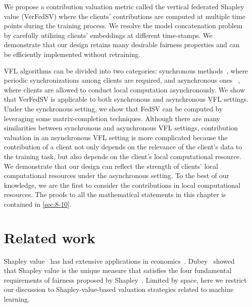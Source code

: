 We propose a contribution valuation metric called the vertical federated Shapley value (VerFedSV)
where the clients' contributions are computed at multiple time points during the training process. We resolve the model concatenation problem by carefully utilizing clients' embeddings at different time-stamps. 
We demonstrate that our design retains many desirable fairness properties and can be efficiently implemented without retraining. 

VFL algorithms can be divided into two categories: synchronous methods~\cite{Gong2016PrivateDA,Zhang2018FeatureDistributedSF,liu2019communication}, where periodic synchronizations
 among clients are required, and asynchronous ones
 ~\cite{Hu2019FDMLAC,Gu2020PrivacyPreservingAF,chen2020vafl}, where clients are allowed to conduct local computation asynchronously. We show that VerFedSV is applicable to both synchronous and asynchronous VFL settings. Under the synchronous setting, we show that FedSV can be computed by leveraging some matrix-completion techniques. Although there are many similarities between synchronous and asynchronous VFL settings, contribution valuation in an asynchronous VFL setting is more complicated because the contribution of a client not only depends on the relevance of the client's data to the training task, but also depends on the client's local computational resource. We demonstrate that our design can reflect the strength of clients' local computational resources under the asynchronous setting. To the best of our knowledge, we are the first to consider the contributions in local computational resources. The proofs to all the mathematical statements in this chapter is contained in \autoref{sec:8-10}.

\section{Related work} \label{sec:8-2}

Shapley value~\cite{shapley201617} has had extensive applications in economics~\cite{gul1989bargaining}. Dubey~\cite{dubey1975uniqueness} showed that Shapley value is the unique measure that satisfies the four fundamental requirements of fairness proposed by Shapley~\cite{shapley201617}. Limited by space, here we restrict our discussion to Shapley-value-based valuation strategies related to machine learning. 

